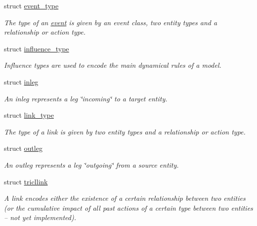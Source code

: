 \begin{DoxyCompactItemize}
struct \hyperlink{structtricl_1_1event__type}{event\+\_\+type}
\begin{DoxyCompactList}\small\item\em The type of an \hyperlink{structtricl_1_1event}{event} is given by an event class, two entity types and a relationship or action type. \end{DoxyCompactList}\item 
struct \hyperlink{structtricl_1_1influence__type}{influence\+\_\+type}
\begin{DoxyCompactList}\small\item\em Influence types are used to encode the main dynamical rules of a model. \end{DoxyCompactList}\item 
struct \hyperlink{structtricl_1_1inleg}{inleg}
\begin{DoxyCompactList}\small\item\em An inleg represents a leg \char`\"{}incoming\char`\"{} to a target entity. \end{DoxyCompactList}\item 
struct \hyperlink{structtricl_1_1link__type}{link\+\_\+type}
\begin{DoxyCompactList}\small\item\em The type of a link is given by two entity types and a relationship or action type. \end{DoxyCompactList}\item 
struct \hyperlink{structtricl_1_1outleg}{outleg}
\begin{DoxyCompactList}\small\item\em An outleg represents a leg \char`\"{}outgoing\char`\"{} from a source entity. \end{DoxyCompactList}\item 
struct \hyperlink{structtricl_1_1tricllink}{tricllink}
\begin{DoxyCompactList}\small\item\em A link encodes either the existence of a certain relationship between two entities (or the cumulative impact of all past actions of a certain type between two entities -- not yet implemented). \end{DoxyCompactList}\end{DoxyCompactItemize}
